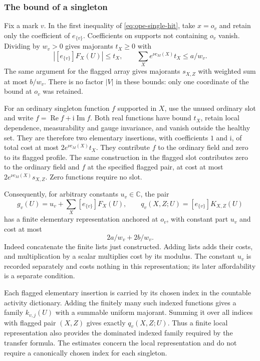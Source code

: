 \subsubsection{The bound of a singleton}
Fix a mark $v$. In the first inequality of
\eqref{eq:ope-single-hit}, take $x=o_v$ and retain only the
coefficient of $e_{\{v\}}$. Coefficients on supports not containing
$o_v$ vanish. Dividing by $w_v>0$ gives majorants $t_X\ge0$ with
\[
 |[e_{\{v\}}]F_X(U)|\le t_X,
 \qquad \sum_Xe^{\nu c_M(X)}t_X\le a/w_v.
\]
The same argument for the flagged array gives majorants $s_{X,Z}$
with weighted sum at most $b/w_v$. There is no factor $|V|$ in
these bounds: only one coordinate of the bound at $o_v$ was retained.

For an ordinary singleton function $f$ supported in $X$, use the
unused ordinary slot and write
$f=\operatorname{Re}f+\mathrm i\operatorname{Im}f$.
Both real functions have bound $t_X$, retain local dependence,
measurability and gauge invariance, and vanish outside the healthy
set. They are therefore two elementary insertions, with coefficients
$1$ and $\mathrm i$, of total cost at most
$2e^{\nu c_M(X)}t_X$. They contribute $f$ to the ordinary field and
zero to its flagged profile. The same construction in the flagged
slot contributes zero to the ordinary field and $f$ at the specified
flagged pair, at cost at most $2e^{\nu c_M(X)}s_{X,Z}$.
Zero functions require no slot.

Consequently, for arbitrary constants $u_v\in\mathbb C$, the pair
\begin{equation}\label{eq:ope-single-pair}
 g_v(U)=u_v+\sum_X[e_{\{v\}}]F_X(U),\qquad
 q_v(X,Z;U)=[e_{\{v\}}]K_{X,Z}(U)
\end{equation}
has a finite elementary representation anchored at $o_v$, with
constant part $u_v$ and cost at most
\begin{equation}\label{eq:ope-single-price}
                         2a/w_v+2b/w_v.
\end{equation}
Indeed concatenate the finite lists just constructed. Adding lists
adds their costs, and multiplication by a scalar multiplies cost
by its modulus. The constant $u_v$ is recorded separately and costs
nothing in this representation; its later affordability is a
separate condition.

Each flagged elementary insertion is carried by its chosen index in
the countable activity dictionary. Adding the finitely many such
indexed functions gives a family $k_{v,j}(U)$ with a summable uniform
majorant. Summing it over all indices with flagged pair $(X,Z)$
gives exactly $q_v(X,Z;U)$. Thus a finite local representation also
provides the dominated indexed family required by the transfer
formula. The estimates concern the local representation and do not
require a canonically chosen index for each singleton.

